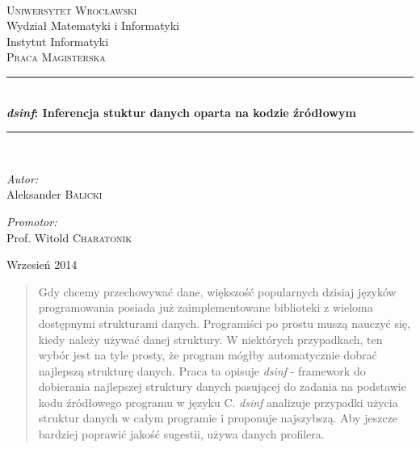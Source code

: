 \documentclass[a4paper,11pt]{article}
\newcommand{\HRule}{\rule{\linewidth}{0.5mm}}
\begin{document}

\begin{titlepage}
\begin{center}

\textsc{\LARGE \\ Uniwersytet Wrocławski }\\
Wydział Matematyki i Informatyki \\
Instytut Informatyki \\[1.5cm]

\textsc{\Large Praca Magisterska}\\[0.5cm]

\HRule \\[0.4cm]
{ \huge \bfseries \emph{dsinf}: Inferencja stuktur danych oparta na kodzie źródłowym \\[0.4cm] }

\HRule \\[1.5cm]

\begin{minipage}{0.4\textwidth}
\begin{flushleft} \large
\emph{Autor:}\\
Aleksander \textsc{Balicki}
\end{flushleft}
\end{minipage}
\begin{minipage}{0.4\textwidth}
\begin{flushright} \large
\emph{Promotor:} \\
Prof. Witold \textsc{Charatonik}
\end{flushright}
\end{minipage}

\vfill

{\large Wrzesień 2014}
\thispagestyle{empty}
\end{center}
\end{titlepage}

\renewcommand{\abstractname}{Streszczenie}
\begin{abstract}

	Gdy chcemy przechowywać dane, większość popularnych dzisiaj języków programowania posiada już zaimplementowane biblioteki z wieloma dostępnymi strukturami danych. 
	Programiści po prostu muszą nauczyć się, kiedy należy używać danej struktury. W niektórych przypadkach, ten wybór jest na tyle prosty,
	że program mógłby automatycznie dobrać najlepszą strukturę danych. Praca ta opisuje \emph{dsinf} - framework do dobierania najlepszej struktury danych pasującej do zadania na podstawie kodu źródłowego programu w języku C. \emph{dsinf} analizuje przypadki użycia struktur danych w całym programie i proponuje najszybszą. 
	Aby jeszcze bardziej poprawić jakość sugestii, używa danych profilera.

\end{abstract}
\thispagestyle{empty}
\pagebreak
\end{document}
